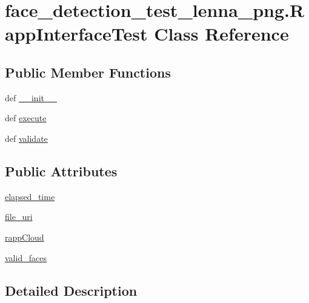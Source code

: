 \hypertarget{classface__detection__test__lenna__png_1_1RappInterfaceTest}{\section{face\-\_\-detection\-\_\-test\-\_\-lenna\-\_\-png.\-Rapp\-Interface\-Test Class Reference}
\label{classface__detection__test__lenna__png_1_1RappInterfaceTest}
}
\subsection*{Public Member Functions}
\begin{DoxyCompactItemize}
\item 
def \hyperlink{classface__detection__test__lenna__png_1_1RappInterfaceTest_a31f0bccbd8934021f6eea8e17db3c0c7}{\-\_\-\-\_\-init\-\_\-\-\_\-}
\item 
def \hyperlink{classface__detection__test__lenna__png_1_1RappInterfaceTest_a99a7c16fa97572d6b6321d54b80c06f5}{execute}
\item 
def \hyperlink{classface__detection__test__lenna__png_1_1RappInterfaceTest_a3d53c1c951e5cd53026ac4baf242cb57}{validate}
\end{DoxyCompactItemize}
\subsection*{Public Attributes}
\begin{DoxyCompactItemize}
\item 
\hyperlink{classface__detection__test__lenna__png_1_1RappInterfaceTest_a86a513fd98bce415dd42408b93e7fadd}{elapsed\-\_\-time}
\item 
\hyperlink{classface__detection__test__lenna__png_1_1RappInterfaceTest_a94641d5de889926fe3e55c1cbd2e2e52}{file\-\_\-uri}
\item 
\hyperlink{classface__detection__test__lenna__png_1_1RappInterfaceTest_aa0a99cfe6b334c630a902cd552b1c515}{rapp\-Cloud}
\item 
\hyperlink{classface__detection__test__lenna__png_1_1RappInterfaceTest_a915f2d9b561207e728535a6e71d3e9bf}{valid\-\_\-faces}
\end{DoxyCompactItemize}


\subsection{Detailed Description}


